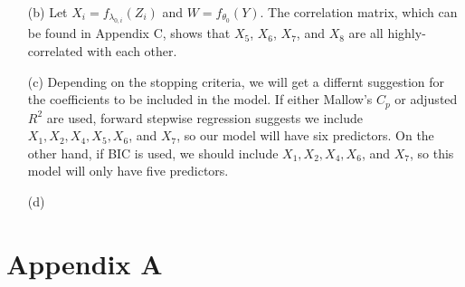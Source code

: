 \documentclass[10pt]{article}
\begin{document}
\begin{itemize}
    \item[(b)] Let \(X_i = f_{\lambda_{0,i}}(Z_i)\) and \(W = f_{\theta_0}(Y)\). The correlation matrix, which can be found in Appendix C, shows that 
    \(X_5\), \(X_6\), \(X_7\), and \(X_8\) are all highly-correlated with each other. 

    \item[(c)] Depending on the stopping criteria, we will get a differnt suggestion for the coefficients to be included in the model. If either Mallow's \(C_p\)
    or adjusted \(R^2\) are used, forward stepwise regression suggests we include \(X_1, X_2, X_4, X_5, X_6\), and \(X_7\), so our model will have six predictors.
    On the other hand, if BIC is used, we should include \(X_1, X_2, X_4, X_6\), and \(X_7\), so this model will only have five predictors.

    \item[(d)] 
\end{itemize}


\section{Appendix A} \noindent
\end{document}
